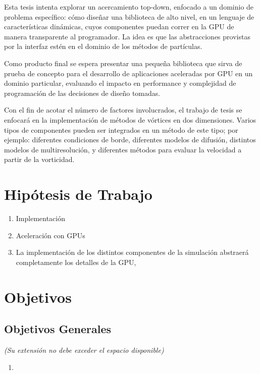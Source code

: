 \documentclass[11pt,spanish]{article}
\begin{document}
Esta tesis intenta explorar un acercamiento top-down, enfocado a un dominio de
problema específico: cómo diseñar una biblioteca de alto nivel, en un lenguaje
de características dinámicas, cuyos componentes puedan correr en la GPU de
manera transparente al programador.  La idea es que las abstracciones provistas
por la interfaz estén en el dominio de los métodos de partículas.

Como producto final se espera presentar una pequeña biblioteca que sirva de
prueba de concepto para el desarrollo de aplicaciones aceleradas por GPU en un
dominio particular, evaluando el impacto en performance y complejidad de
programación de las decisiones de diseño tomadas.

Con el fin de acotar el número de factores involucrados, el trabajo de tesis se
enfocará en la implementación de métodos de vórtices en dos dimensiones.  Varios
tipos de componentes pueden ser integrados en un método de este tipo; por
ejemplo: diferentes condiciones de borde, diferentes modelos de difusión,
distintos modelos de multiresolución, y diferentes métodos para evaluar la
velocidad a partir de la vorticidad.



\newpage
\section{Hipótesis de Trabajo}
\begin{enumerate}
    \item Implementación
    \item Aceleración con GPUs
    \item La implementación de los distintos componentes de la simulación
        abstraerá completamente los detalles de la GPU, 
\end{enumerate}

\section{Objetivos }

\subsection{Objetivos Generales}
\emph{(Su extensión no debe exceder el espacio disponible)}

\begin{enumerate}
    \item
\end{enumerate}
\end{document}
